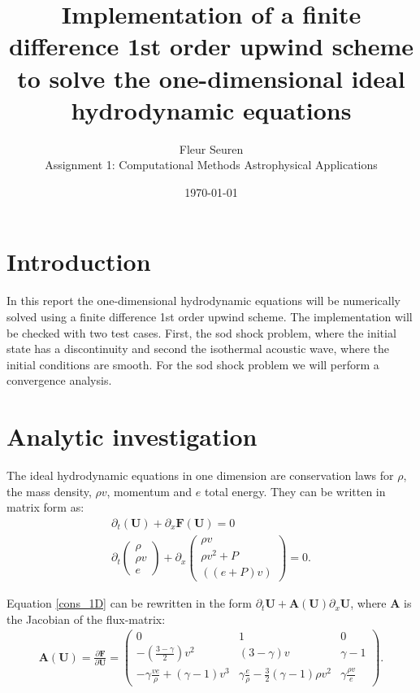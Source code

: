 \documentclass[12pt,a4paper]{article}
\title{Implementation of a finite difference 1st order upwind scheme to solve the one-dimensional ideal hydrodynamic equations}
\date{\small{\today}}
\author{\normalsize{Fleur Seuren\\ \normalsize{Assignment 1: Computational Methods  Astrophysical Applications}}}
\begin{document}
\maketitle

\section{Introduction}
In this report the one-dimensional hydrodynamic equations will be numerically solved using a finite difference 1st order upwind scheme. The implementation will be checked with two test cases. First, the sod shock problem, where the initial state has a discontinuity and second the isothermal acoustic wave, where the initial conditions are smooth. For the sod shock problem we will perform a convergence analysis. 

\section{Analytic investigation}
The ideal hydrodynamic equations in one dimension are conservation laws for $\rho$, the mass density, $\rho v$, momentum and $e$ total energy. They can be written in matrix form as:
\begin{align}
\partial_{t}\left(\textbf{U}\right) + \partial_{x}\textbf{F}\left(\textbf{U}\right) = 0 \\
\partial_{t}\begin{pmatrix} \rho \\
\rho v \\
e
\end{pmatrix}
+
\partial_{x}\begin{pmatrix} \rho v \\
\rho v^{2} + P \\
\left((e + P) v\right)
\end{pmatrix} = 0. \label{cons_1D}
\end{align}

Equation \eqref{cons_1D} can be rewritten in the form $\partial_t \textbf{U} + \textbf{A}\left(\textbf{U}\right)\partial_x \textbf{U}$, where $\textbf{A}$ is the Jacobian of the flux-matrix: 
\begin{align}
\textbf{A}\left(\textbf{U}\right) = \frac{\partial \textbf{F}}{\partial \textbf{U}} = 
\begin{pmatrix}
0 & 1 & 0 \\
- \left(\frac{3-\gamma}{2}\right)v^{2} & \left(3 - \gamma\right)v & \gamma - 1 \\
- \gamma \frac{v e}{\rho} + \left(\gamma - 1\right)v^{3} & \gamma \frac{ e}{\rho} - \frac{3}{2}\left(\gamma -1 \right)\rho v^{2} & \gamma\frac{\rho v}{e}
\end{pmatrix}. \label{A}
\end{align}
\end{document}
